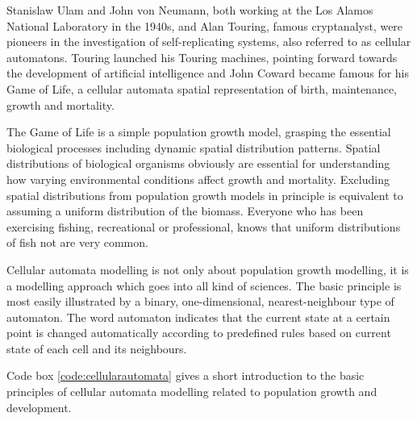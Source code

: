 \documentclass[11pt,fleqn]{book} %
\begin{document}
Stanislaw Ulam and John von Neumann, both working at the Los Alamos National Laboratory in the 1940s, and Alan Touring, famous cryptanalyst, were pioneers in the investigation of self-replicating systems, also referred to as cellular automatons. Touring launched his Touring machines, pointing forward towards the development of artificial intelligence and John Coward became famous for his Game of Life\cite{Gardner1970Mathematicallife,Wolfram1983}, a cellular automata spatial representation of birth, maintenance, growth and mortality.

The Game of Life is a simple population growth model, grasping the essential biological processes including dynamic spatial distribution patterns. Spatial distributions of biological organisms obviously are essential for understanding how varying environmental conditions affect growth and mortality. Excluding spatial distributions from population growth models in principle is equivalent to assuming a uniform distribution of the biomass. Everyone who has been exercising fishing, recreational or professional, knows that uniform distributions of fish not are very common.

Cellular automata modelling is not only about population growth modelling, it is a modelling approach which goes into all kind of sciences. The basic principle is most easily illustrated by a binary, one-dimensional, nearest-neighbour type of automaton. The word automaton indicates that the current state at a certain point is changed automatically according to predefined rules based on current state of each cell and its neighbours.

Code box \ref{code:cellularautomata} gives a short introduction to the basic principles of cellular automata modelling related to population growth and development.
\end{document}

